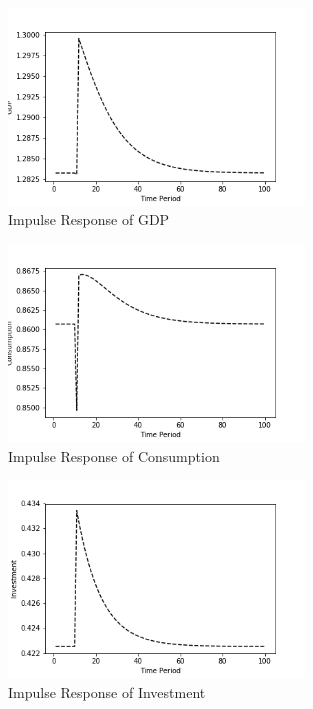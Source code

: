 \documentclass[letterpaper,11pt]{article}
\theoremstyle{definition}
\begin{document}
\begin{spacing}{1.5}
	\begin{figure}[H]
		\caption{Impulse Response of GDP}
		\label{fig:GDP_impulse}
		\includegraphics[width=0.7\textwidth]{GDPimpulse.png}
	\end{figure}

	\begin{figure}[H]
		\caption{Impulse Response of Consumption}
		\label{fig:consumption_impulse}
		\includegraphics[width=0.7\textwidth]{Consumptionimpulse.png}
	\end{figure}

	\begin{figure}[H]
		\caption{Impulse Response of Investment}
		\label{fig:investment_impulse}
		\includegraphics[width=0.7\textwidth]{Investmentimpulse.png}
	\end{figure}


\end{spacing}
\end{document}
